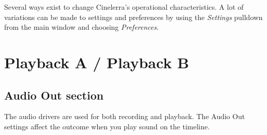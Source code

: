 Several ways exist to change Cinelerra’s operational characteristics.  A lot of variations can be made to  settings and preferences by using the \textit{Settings} pulldown from the main window and choosing \textit{Preferences}.

\section{Playback A / Playback B}%
\label{sec:playback_a_b}

\subsection{Audio Out section}%
\label{sub:audio_out_section}

The audio drivers are used for both recording and playback. The Audio Out settings affect the outcome when you play sound on the timeline.

